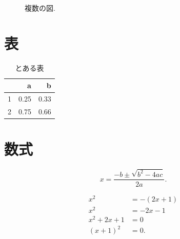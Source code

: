 \begin{figure}[ht]
\centering 
{}
\caption{複数の図.}
\label{fig:examples}
\end{figure}




\section{表}
\begin{table}[ht]
\centering
\begin{tabular}{r|rr}
& a & b\\ 
\hline
1& 0.25 & 0.33\\
2& 0.75 & 0.66\\
\end{tabular}
\caption{とある表}\label{table:example}
\end{table}


\section{数式}

\begin{equation}
x = \frac{-b \pm \sqrt{b^2-4ac}}{2a}. \label{eq:example}
\end{equation}

\begin{align}
x^2 &= -(2x +1) \\
x^2 &= -2x -1 \nonumber\\
x^2+2x +1 &= 0 \label{eq:example2}\\
(x+1)^2 &=0 \label{eq:example3}.
\end{align}

